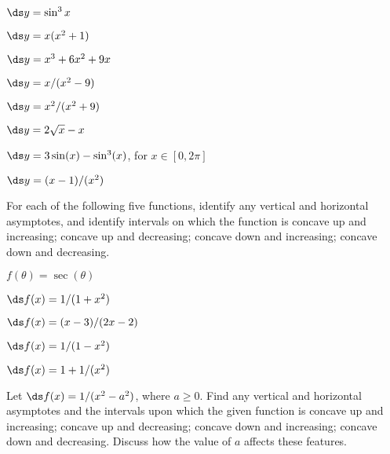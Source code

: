 \begin{exercises}
\begin{exercise} $\ds y = \sin^3 x$
\end{exercise}

\begin{exercise} $\ds y=x(x^2+1)$
\end{exercise}

\begin{exercise} $\ds y=x^3+6x^2 + 9x$
\end{exercise}

\begin{exercise} $\ds y=x/(x^2-9)$
\end{exercise}

\begin{exercise} $\ds y=x^2/(x^2+9)$
\end{exercise}

\begin{exercise} $\ds y=2\sqrt{x} - x$
\end{exercise}

\begin{exercise} $\ds y=3\sin(x) - \sin^3(x)$, for $x\in[0,2\pi]$
\end{exercise}

\begin{exercise} $\ds y=(x-1)/(x^2)$
\end{exercise}

\endtwocol

\msk
\noindent
For each of the following five functions, identify any vertical and horizontal
asymptotes, and identify intervals on which the function is 
concave up and increasing; concave up and decreasing; concave
down and increasing; concave down and decreasing.

\begin{exercise} $f(\theta)=\sec(\theta)$ \end{exercise}
\begin{exercise} $\ds f(x) = 1/(1+x^2)$\end{exercise}
\begin{exercise} $\ds f(x) = (x-3)/(2x-2)$ \end{exercise}
\begin{exercise} $\ds f(x) = 1/(1-x^2)$\end{exercise}
\begin{exercise} $\ds f(x) = 1+1/(x^2)$\end{exercise}

\begin{exercise} Let $\ds f(x) = 1/(x^2-a^2)$, where $a\geq0$.  Find any
 vertical and horizontal asymptotes and the intervals upon which the
 given function is concave up and increasing; concave up and
 decreasing; concave down and increasing; concave down and decreasing.
 Discuss how the value of $a$ affects these features.
\end{exercise}



\end{exercises}

